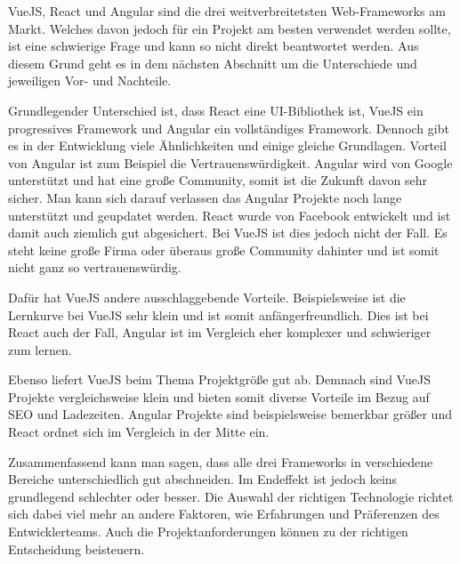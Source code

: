 VueJS, React und Angular sind die drei weitverbreitetsten Web-Frameworks am Markt. Welches davon jedoch für ein Projekt am besten verwendet werden sollte, ist eine schwierige Frage und kann so nicht direkt beantwortet werden. Aus diesem Grund geht es in dem nächsten Abschnitt um die Unterschiede und jeweiligen Vor- und Nachteile.

Grundlegender Unterschied ist, dass React eine UI-Bibliothek ist, VueJS ein progressives Framework und Angular ein vollständiges Framework. Dennoch gibt es in der Entwicklung viele Ähnlichkeiten und einige gleiche Grundlagen.
Vorteil von Angular ist zum Beispiel die Vertrauenswürdigkeit. Angular wird von Google unterstützt und hat eine große Community, somit ist die Zukunft davon sehr sicher. Man kann sich darauf verlassen das Angular Projekte noch lange unterstützt und geupdatet werden. React wurde von Facebook entwickelt und ist damit auch ziemlich gut abgesichert. Bei VueJS ist dies jedoch nicht der Fall. Es steht keine große Firma oder überaus große Community dahinter und ist somit nicht ganz so vertrauenswürdig.

Dafür hat VueJS andere ausschlaggebende Vorteile. Beispielsweise ist die Lernkurve bei VueJS sehr klein und ist somit anfängerfreundlich. Dies ist bei React auch der Fall, Angular ist im Vergleich eher komplexer und schwieriger zum lernen.

Ebenso liefert VueJS beim Thema Projektgröße gut ab. Demnach sind VueJS Projekte vergleichsweise klein und bieten somit diverse Vorteile im Bezug auf SEO und Ladezeiten. Angular Projekte sind beispielsweise bemerkbar größer und React ordnet sich im Vergleich in der Mitte ein.

Zusammenfassend kann man sagen, dass alle drei Frameworks in verschiedene Bereiche unterschiedlich gut abschneiden. Im Endeffekt ist jedoch keins grundlegend schlechter oder besser. Die Auswahl der richtigen Technologie richtet sich dabei viel mehr an andere Faktoren, wie Erfahrungen und Präferenzen des Entwicklerteams. Auch die Projektanforderungen können zu der richtigen Entscheidung beisteuern.
\cite{frontend_web_comparison}